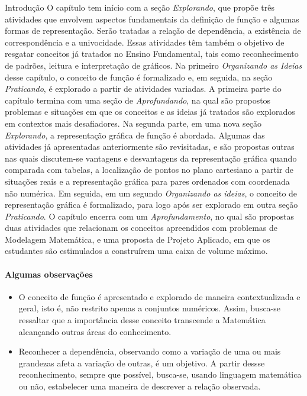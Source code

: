 \begin{apresentacao}{Introdução}
O capítulo tem início com a seção \textit{Explorando}, que propõe três atividades que envolvem aspectos fundamentais da definição de função e algumas formas de representação. Serão tratadas a relação de dependência, a existência de correspondência e a univocidade. Essas atividades têm também o objetivo de resgatar conceitos já tratados no Ensino Fundamental, tais como reconhecimento de padrões, leitura e interpretação de gráficos. Na primeiro \textit{Organizando as Ideias} desse capítulo, o conceito de função é formalizado e, em seguida, na seção \textit{Praticando}, é explorado a partir de atividades variadas.  A primeira parte do capítulo termina com uma seção de \textit{Aprofundando}, na qual são propostos problemas e situações em que os conceitos e as ideias já tratados são explorados em contextos mais desafiadores. Na segunda parte, em uma nova seção \textit{Explorando}, a representação gráfica de função é abordada. Algumas das atividades já apresentadas anteriormente são revisitadas, e são propostas outras nas quais discutem-se vantagens e desvantagens da representação gráfica quando comparada com tabelas, a localização de pontos no plano cartesiano a partir de situações reais e a representação gráfica para pares ordenados com coordenada não numérica. Em seguida, em um segundo \textit{Organizando as ideias}, o conceito de representação gráfica é formalizado, para logo após ser explorado em outra seção \textit{Praticando}. O capítulo encerra com um \textit{Aprofundamento}, no qual são propostas duas atividades que relacionam os conceitos apreendidos com problemas de Modelagem Matemática, e uma proposta de Projeto Aplicado, em que os estudantes são estimulados a construírem uma caixa de volume máximo.

\paragraph{Algumas observações}

\begin{itemize}
\item {} 
O conceito de função é apresentado e explorado de maneira contextualizada e geral, isto é, não restrito apenas a conjuntos numéricos. Assim, busca-se ressaltar que a importância desse conceito transcende a Matemática alcançando outras áreas do conhecimento.

\item {} 
Reconhecer a dependência, observando como a variação de uma ou mais grandezas afeta        a variação de outras, é um objetivo. A partir dessse reconhecimento, sempre que possível, busca-se, usando linguagem matemática ou não, estabelecer uma maneira de descrever a relação observada.


\end{itemize}
\end{apresentacao}
